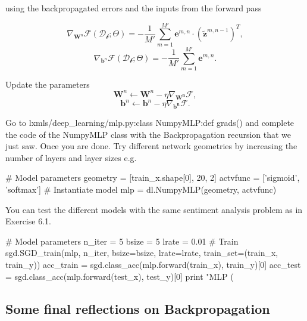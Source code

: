 \begin{algorithm}[th!]
\begin{algorithmic}[1]
		\ENDFOR	
        \ENDIF 

		\vspace{0.3cm}
         using the backpropagated errors and the inputs from the forward pass

        $$\nabla_{\mathbf{W}^n}\mathcal{F}(\mathcal{D_b};\Theta)  = -\frac{1}{M'} \sum_{m=1}^{M'} \mathbf{e}^{m,n} \cdot \left(\tilde{\mathbf{z}}^{m,n-1}\right)^T,$$ 
        $$\nabla_{\mathbf{b}^n}\mathcal{F}(\mathcal{D_b};\Theta)  = - \frac{1}{M'} \sum_{m=1}^{M'} \mathbf{e}^{m,n}.$$  

		\vspace{0.3cm}
        \STATE Update the parameters 
            $$\mathbf{W}^n \leftarrow \mathbf{W}^n - \eta \nabla_\mathbf{W^n}\mathcal{F},$$ 
            $$\mathbf{b}^n \leftarrow \mathbf{b}^n - \eta \nabla_\mathbf{b^n}\mathcal{F}.$$ 

	\ENDFOR

	\ENDFOR
	\ENDFOR
\end{algorithmic}
\end{algorithm}

\clearpage

\begin{exercise}
Go to lxmls/deep\_learning/mlp.py:class NumpyMLP:def grads() and complete the
code of the NumpyMLP class with the Backpropagation recursion that we just saw.
Once you are done. Try different network geometries by increasing the number of
layers and layer sizes e.g.
\begin{python}
# Model parameters
geometry = [train_x.shape[0], 20, 2]
actvfunc = ['sigmoid', 'softmax'] 
# Instantiate model
mlp      = dl.NumpyMLP(geometry, actvfunc) 
\end{python}
You can test the different models with the same sentiment analysis problem as
in Exercise 6.1. 
\begin{python}
# Model parameters
n_iter = 5
bsize  = 5
lrate  = 0.01
# Train
sgd.SGD_train(mlp, n_iter, bsize=bsize, lrate=lrate, train_set=(train_x, train_y))
acc_train = sgd.class_acc(mlp.forward(train_x), train_y)[0]
acc_test  = sgd.class_acc(mlp.forward(test_x), test_y)[0]
print "MLP (%
\end{python}
\end{exercise}

\subsection{Some final reflections on Backpropagation}

